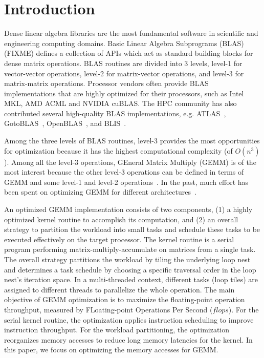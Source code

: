 \section{Introduction}\label{sec:intro}
Dense linear algebra libraries are the most fundamental software in
scientific and engineering computing domains.
Basic Linear Algebra Subprograms (BLAS) (FIXME) defines a collection
of APIs which act as standard building blocks for dense matrix operations.
BLAS routines are divided into 3 levels,
level-1 for vector-vector operations,
level-2 for matrix-vector operations,
and level-3 for matrix-matrix operations.
Processor vendors often provide BLAS implementations
that are highly optimized for their processors,
such as Intel MKL, AMD ACML and NVIDIA cuBLAS.
The HPC community has also contributed several high-quality
BLAS implementations, e.g. ATLAS~\cite{atlas},
GotoBLAS~\cite{gotoblas}, OpenBLAS~\cite{openblas},
and BLIS~\cite{blis,blisport}.

Among the three levels of BLAS routines, level-3 provides the most opportunities
for optimization because it has the highest computational complexity (of $O(n^3)$).
Among all the level-3 operations, GEneral Matrix Multiply (GEMM) is
of the most interest because the 
other level-3 operations can be defined
in terms of GEMM and some level-1 and level-2 operations~\cite{gemmbased1}.
In the past, much effort has been spent on optimizing GEMM for different
architectures~\cite{Liu2012,Wang2015,Volkov:2008,Cui11,blispar}.

An optimized GEMM implementation consists of two components,
(1) a highly optimized kernel routine to accomplish its
computation, and
(2) an overall strategy to partition the workload into small tasks
and schedule these tasks to be executed effectively on the target processor.
The kernel routine is a serial program performing matrix-multiply-accumulate
on matrices from a single task.
The overall strategy partitions the workload by tiling 
the underlying loop nest
and determines a task schedule by choosing a specific traversal order
in the loop nest's iteration space.
In a multi-threaded context, different tasks (loop tiles) are assigned to
different threads to parallelize the whole operation.
The main objective of GEMM optimization is to
maximize the floating-point
operation throughput, measured by FLoating-point Operations Per Second ($flops$).
For the serial kernel routine, the optimization applies
instruction scheduling to improve instruction throughput.
For the workload partitioning, the optimization 
reorganizes memory accesses to reduce long memory latencies for
the kernel.
In this paper, we focus on optimizing the memory 
accesses for GEMM.

